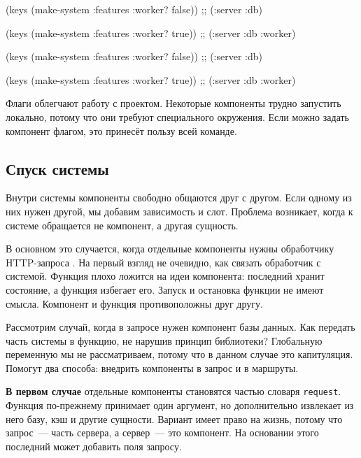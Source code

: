 \ifnarrow

\begin{english}
  \begin{clojure}
(keys (make-system
        {:features {:worker? false}}))
;; (:server :db)

(keys (make-system
        {:features {:worker? true}}))
;; (:server :db :worker)
  \end{clojure}
\end{english}

\else

\begin{english}
  \begin{clojure}
(keys (make-system {:features {:worker? false}}))
;; (:server :db)

(keys (make-system {:features {:worker? true}}))
;; (:server :db :worker)
  \end{clojure}
\end{english}

\fi

Флаги облегчают работу с проектом. Некоторые компоненты трудно запустить
локально, потому что они требуют специального окружения. Если можно задать
компонент флагом, это принесёт пользу всей команде.

\subsection{Спуск системы}


Внутри системы компоненты свободно общаются друг с другом. Если одному из них
нужен другой, мы добавим зависимость и слот. Проблема возникает, когда к системе
обращается не компонент, а другая сущность.

В основном это случается, когда отдельные компоненты нужны обработчику
HTTP-запроса . На первый взгляд не очевидно, как связать
обработчик с системой. Функция плохо ложится на идеи компонента: последний
хранит состояние, а функция избегает его. Запуск и остановка функции не имеют
смысла. Компонент и функция противоположны друг другу.

Рассмотрим случай, когда в запросе нужен компонент базы данных. Как передать
часть системы в функцию, не нарушив принцип библиотеки? Глобальную переменную мы
не рассматриваем, потому что в данном случае это капитуляция. Помогут два
способа: внедрить компоненты в запрос и в маршруты.

\textbf{В первом случае} отдельные компоненты становятся частью словаря
\verb|request|. Функция по-прежнему принимает один аргумент, но дополнительно
извлекает из него базу, кэш и другие сущности. Вариант имеет право на жизнь,
потому что запрос~--- часть сервера, а сервер~--- это компонент. На основании
этого последний может добавить поля запросу.

